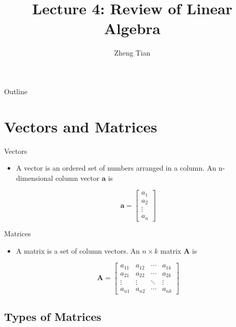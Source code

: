 \documentclass[presentation]{beamer}
\author{Zheng Tian}
\date{}
\title{Lecture 4: Review of Linear Algebra}
\begin{document}
\maketitle
\begin{frame}{Outline}
\setcounter{tocdepth}{1}
\tableofcontents
\end{frame}



\section{Vectors and Matrices}
\label{sec:org68f12a8}

\begin{frame}[label={sec:org4e7f6e9}]{Vectors}
\begin{itemize}
\item A \alert{vector} is an ordered set of numbers arranged in a column. An
n-dimensional column vector \(\mathbf{a}\) is 

\begin{equation*}
\mathbf{a} =
 \begin{bmatrix}
 a_1 \\ a_2 \\ \vdots \\ a_n
 \end{bmatrix}
\end{equation*}
\end{itemize}
\end{frame}

\begin{frame}[label={sec:orgc396a63}]{Matrices}
\begin{itemize}
\item A \alert{matrix} is a set of column vectors. An \(n \times k\) matrix
\(\mathbf{A}\) is

\begin{equation*}
\mathbf{A} = 
\begin{bmatrix}
a_{11} & a_{12} & \cdots & a_{1k} \\
a_{21} & a_{22} & \cdots & a_{2k} \\
\vdots & \vdots & \ddots & \vdots \\
a_{n1} & a_{n2} & \cdots & a_{nk}
\end{bmatrix}
\end{equation*}
\end{itemize}
\end{frame}

\subsection*{Types of Matrices}
\label{sec:orgc114e01}
\end{document}
